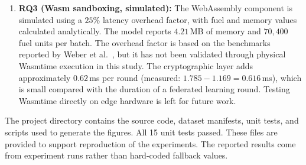 \documentclass[11pt,a4paper]{article}
\begin{document}
\begin{enumerate}[leftmargin=1.8em,itemsep=1pt]
    \item \textbf{RQ3 (Wasm sandboxing, simulated):} The WebAssembly component is simulated using a $25\%$ latency overhead factor, with fuel and memory values calculated analytically. The model reports $4.21$\,MB of memory and $70{,}400$ fuel units per batch. The overhead factor is based on the benchmarks reported by Weber et al.~\cite{weber2026}, but it has not been validated through physical Wasmtime execution in this study. The cryptographic layer adds approximately $0.62$\,ms per round (measured: $1.785 - 1.169 = 0.616$\,ms), which is small compared with the duration of a federated learning round. Testing Wasmtime directly on edge hardware is left for future work.
\end{enumerate}

The project directory contains the source code, dataset manifests, unit tests, and scripts used to generate the figures. All 15 unit tests passed. These files are provided to support reproduction of the experiments. The reported results come from experiment runs rather than hard-coded fallback values.
\end{document}
